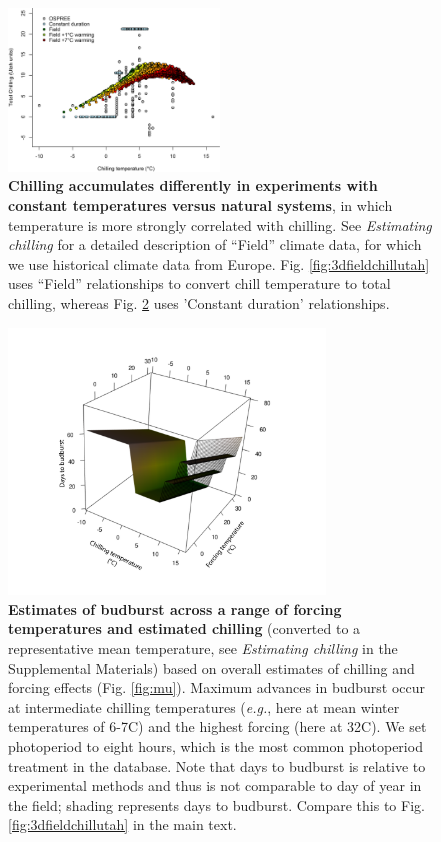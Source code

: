 \documentclass{article}
\begin{document}
\begin{figure}[h!]
\centering
\noindent \includegraphics[width=0.50\textwidth]{..//..//analyses/bb_analysis/figures/exp_vs_field_chill_withwarmingcols.png}
\caption{\textbf{Chilling accumulates differently in experiments with constant temperatures versus natural systems}, in which temperature is more strongly correlated with chilling. See \emph{Estimating chilling} for a detailed description of ``Field'' climate data, for which we use historical climate data from Europe. Fig. \ref{fig:3dfieldchillutah} uses ``Field'' relationships to convert chill temperature to total chilling, whereas Fig. \ref{fig:3dexpchillutah} uses 'Constant duration' relationships.}
\label{fig:chillexpfield}
\end{figure}

 \begin{figure}[h!]
 \centering
 \noindent \includegraphics[width=0.75\textwidth]{..//..//analyses/bb_analysis/figures/bbmod_3dplot_utah.pdf}
 \caption{\textbf{Estimates of budburst across a range of forcing temperatures and estimated chilling} (converted to a representative mean temperature, see \emph{Estimating chilling} in the Supplemental Materials) based on overall estimates of chilling and forcing effects (Fig. \ref{fig:mu}). Maximum advances in budburst occur at intermediate chilling temperatures (\emph{e.g.}, here at mean winter temperatures of 6-7\degree C) and the highest forcing (here at 32\degree C). We set photoperiod to eight hours, which is the most common photoperiod treatment in the database. Note that days to budburst is relative to experimental methods and thus is not comparable to day of year in the field; shading represents days to budburst. Compare this to Fig. \ref{fig:3dfieldchillutah} in the main text.} 
 \label{fig:3dexpchillutah}
 \end{figure}
 \newpage
\end{document}
